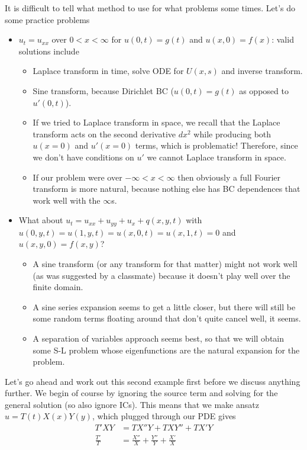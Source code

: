 \documentclass[10pt]{report}
\begin{document}
It is difficult to tell what method to use for what problems some times. Let's do some practice problems
\begin{itemize}
    \item $u_t = u_{xx}$ over $0 < x < \infty$ for $u(0,t) = g(t)$ and $u(x,0) = f(x)$: valid solutions include
        \begin{itemize}
            \item Laplace transform in time, solve ODE for $U(x,s)$ and inverse transform.
            \item Sine transform, because Dirichlet BC ($u(0,t) = g(t)$ as opposed to $u'(0,t)$).
            \item If we tried to Laplace transform in space, we recall that the Laplace transform acts on the second derivative $dx^2$ while producing both $u(x=0)$ and $u'(x=0)$ terms, which is problematic! Therefore, since we don't have conditions on $u'$ we cannot Laplace transform in space.
            \item If our problem were over $-\infty < x < \infty$ then obviously a full Fourier transform is more natural, because nothing else has BC dependences that work well with the $\infty$s.
        \end{itemize}
    \item What about $u_t = u_{xx} + u_{yy} + u_x + q(x,y,t)$ with $u(0,y,t) = u(1,y,t) = u(x,0,t) = u(x,1,t) = 0$ and $u(x,y,0) = f(x,y)$?
        \begin{itemize}
            \item A sine transform (or any transform for that matter) might not work well (as was suggested by a classmate) because it doesn't play well over the finite domain.
            \item A sine series expansion seems to get a little closer, but there will still be some random terms floating around that don't quite cancel well, it seems.
            \item A separation of variables approach seems best, so that we will obtain some S-L problem whose eigenfunctions are the natural expansion for the problem. 
        \end{itemize}
\end{itemize}

Let's go ahead and work out this second example first before we discuss anything further. We begin of course by ignoring the source term and solving for the general solution (so also ignore ICs). This means that we make ansatz $u = T(t)X(x)Y(y)$, which plugged through our PDE gives
\begin{align}
    T'XY &= TX''Y + TXY'' + TX'Y\\
    \frac{T'}{T} &= \frac{X''}{X} + \frac{Y''}{Y} + \frac{X'}{X}
\end{align}
\end{document}
